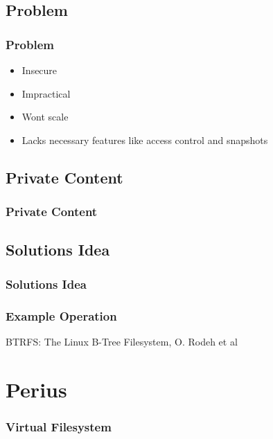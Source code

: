 \documentclass{beamer}
\begin{document}
\subsection{Problem}
\begin{frame}
  \frametitle{Problem}
  \begin{itemize}
    \item{Insecure} %
    \pause
    \item{Impractical} %
    \pause
    \item{Wont scale} %
    \pause
    \item{Lacks necessary features like access control and snapshots}
  \end{itemize}
\end{frame}

\subsection{Private Content}
\begin{frame}
  \frametitle{Private Content}
  \centerline{}
\end{frame}

\subsection{Solutions Idea}
\begin{frame}
  \frametitle{Solutions Idea}
  \centerline{}
\end{frame}
\begin{frame}
  \frametitle{Example Operation}
  \centerline{}
  \vspace{20pt}
  \centerline{\tiny{BTRFS: The Linux B-Tree Filesystem, O. Rodeh et al}}
\end{frame}

\section{Perius}
\begin{frame}
  \frametitle{Virtual Filesystem}
  \centerline{}
\end{frame}
\end{document}
